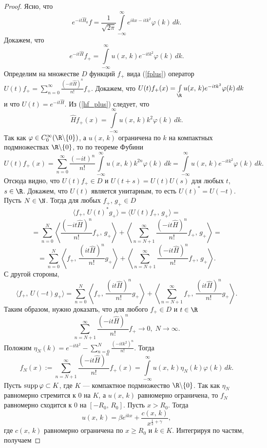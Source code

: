 \documentclass[a4paper
]{article}
\begin{document}
\begin{proof}
Ясно, что $$e^{-it\hat H_0}f=\frac{1}{\sqrt{2\pi}}\int \limits_{-\infty}
^\infty e^{ikx-itk^2}\varphi(k)\, dk.$$ Докажем, что $$e^{-it\hat H}f_+
=\int \limits_{-\infty}^\infty u(x, \, k)e^{-itk^2}\varphi(k)\, dk.$$
Определим на множестве $D$ функций $f_+$ вида (\ref{fplus}) оператор
$U(t)f_+=\sum \limits_{n=0}^\infty \frac{(-it\hat H)^n}{n!}f_+$.
Докажем, что $U(t)f_+(x)=\int \limits_{\R}u(x, \, k)e^{-itk^2}\varphi(k)
\, dk$ и что $U(t)=e^{-it\hat H}$. Из (\ref{hf_plus}) следует, что
$$\hat Hf_+(x)=\int \limits_{-\infty}^\infty u(x, \, k)k^2\varphi(k)\, dk.$$
Так как $\varphi\in C_0^\infty(\R\backslash\{0\})$, а $u(x, \, k)$
ограничена по $k$ на компактных подмножествах $\R\backslash\{0\}$, то
по теореме Фубини $$U(t)f_+(x)=\sum \limits_{n=0}^\infty \frac{(-it)^n}
{n!}\int \limits_{-\infty}^\infty u(x, \, k)k^{2n}\varphi(k)\, dk
=\int \limits_{-\infty}^\infty u(x, \, k)e^{-itk^2}\varphi(k)\, dk.$$
Отсюда видно, что $U(t)f_+\in D$ и $U(t+s)=U(t)U(s)$ для любых $t$,
$s\in \R$. Докажем, что $U(t)$ является унитарным, то есть $U(t)^*=
U(-t)$. Пусть $N\in \N$. Тогда для любых $f_+$, $g_+\in D$
$$\langle f_+, \, U(t)^*g_+\rangle=\langle U(t)f_+, \,
g_+\rangle=$$ $$=\sum \limits_{n=0}^N \left \langle \frac{(-it\hat H)^n}
{n!}f_+, \, g_+\right\rangle+\left\langle \sum \limits_{n=N+1}^\infty
\frac{(-it\hat H)^n}{n!}f_+, \, g_+\right\rangle=$$ $$=\sum \limits_{n=0}^N
\left\langle f_+, \, \frac{(it\hat H)^n}{n!}g_+\right\rangle+\left\langle
\sum \limits_{n=N+1}^\infty \frac{(-it\hat H)^n}{n!}f_+, \, g_+
\right\rangle.$$ С другой стороны, $$\langle f_+, \, U(-t)
g_+\rangle=\sum \limits_{n=0}^N \left\langle f_+, \, \frac{(it\hat
H)^n}{n!}g_+\right\rangle+\left\langle \sum \limits_{n=N+1}^\infty f_+, \,
\frac{(it\hat H)^n}{n!}g_+\right\rangle.$$ Таким образом, нужно доказать, что
для любого $f_+\in D$ и $t\in \R$ $$\sum \limits_{n=N+1}^\infty \frac{(-it\hat
H)^n}{n!}f_+\rightarrow 0, \; N\rightarrow \infty .$$ Положим $\eta_N(k)
=e^{-itk^2}-\sum \limits_{n=0}^N\frac{(-itk^2)^n}{n!}$. Тогда
$$f_N(x):=\sum \limits_{n=N+1}^\infty \frac{(-it\hat H)^n}{n!}f_+(x)= \int
\limits _{-\infty}^\infty u(x, \, k)\eta_N(k)\varphi(k)\, dk.$$
Пусть ${\rm supp}\, \varphi\subset K$, где $K$ --- компактное подмножество
$\R\backslash\{0\}$. Так как $\eta_N$ равномерно стремится к 0 на $K$,
а $u(x, \, k)$ равномерно ограничена, то $f_N$ равномерно сходится к 0
на $[-R_0, \, R_0]$. Пусть $x>R_0$. Тогда $$u(x, \, k)=\beta e^{ikx}+
\frac{c(x, \, k)}{x^{\frac12+\gamma}},$$ где $c(x, \, k)$ равномерно
ограничена по $x\ge R_0$ и $k\in K$. Интегрируя по частям, получаем

\end{proof}
\end{document}
